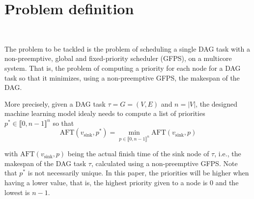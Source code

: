 \section{Problem definition}
~

The problem to be tackled is the problem of scheduling a single DAG task with a non-preemptive, global and fixed-priority scheduler (GFPS),
on a multicore system. That is, the problem of computing a priority for each node for a DAG task so that it minimizes, 
using a non-preemptive GFPS, the makespan of the DAG.

More precisely, given a DAG task $\tau = G = (V, E)$ and $n = \left\lvert V \right\rvert$, the designed machine learning model 
idealy needs to compute a list of priorities $p^* \in \llbracket 0, n-1 \rrbracket^{n}$
so that 
$$
    \text{AFT}(v_{\text{sink}}, p^*) = \min_{p \in \llbracket 0, n-1 \rrbracket^{n}} \text{AFT}(v_{\text{sink}}, p)
$$

with $\text{AFT}(v_{\text{sink}}, p)$ being the actual finish time of the
sink node of $\tau$, i.e., the makespan of the DAG task $\tau$,
calculated using a non-preemptive GFPS. Note that $p^*$ is not necessarily unique.
In this paper, the priorities will be higher when having a lower value,
that is, the highest priority given to a node is 0 and the lowest is $n-1$.

%

